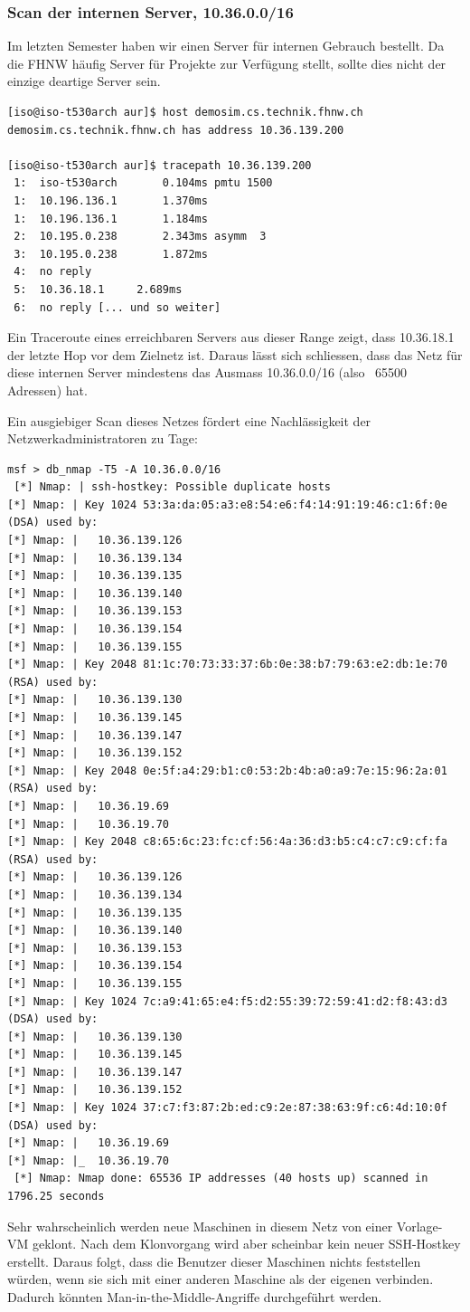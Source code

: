 \documentclass[11pt,a4paper]{scrartcl}
\begin{document}
\subsubsection{Scan der internen Server, 10.36.0.0/16}
Im letzten Semester haben wir einen Server für internen Gebrauch bestellt. Da die FHNW häufig Server für Projekte zur Verfügung stellt, sollte dies nicht der einzige deartige Server sein.
\begin{lstlisting}
[iso@iso-t530arch aur]$ host demosim.cs.technik.fhnw.ch
demosim.cs.technik.fhnw.ch has address 10.36.139.200

[iso@iso-t530arch aur]$ tracepath 10.36.139.200
 1:  iso-t530arch		0.104ms pmtu 1500
 1:  10.196.136.1		1.370ms 
 1:  10.196.136.1		1.184ms 
 2:  10.195.0.238		2.343ms asymm  3 
 3:  10.195.0.238		1.872ms 
 4:  no reply
 5:  10.36.18.1		2.689ms 
 6:  no reply [... und so weiter]
\end{lstlisting}
Ein Traceroute eines erreichbaren Servers aus dieser Range zeigt, dass 10.36.18.1 der letzte Hop vor dem Zielnetz ist. Daraus lässt sich schliessen, dass das Netz für diese internen Server mindestens das Ausmass 10.36.0.0/16 (also ~65500 Adressen) hat.

Ein ausgiebiger Scan dieses Netzes fördert eine Nachlässigkeit der Netzwerkadministratoren zu Tage:
\begin{lstlisting}
msf > db_nmap -T5 -A 10.36.0.0/16
 [*] Nmap: | ssh-hostkey: Possible duplicate hosts
[*] Nmap: | Key 1024 53:3a:da:05:a3:e8:54:e6:f4:14:91:19:46:c1:6f:0e (DSA) used by:
[*] Nmap: |   10.36.139.126
[*] Nmap: |   10.36.139.134
[*] Nmap: |   10.36.139.135
[*] Nmap: |   10.36.139.140
[*] Nmap: |   10.36.139.153
[*] Nmap: |   10.36.139.154
[*] Nmap: |   10.36.139.155
[*] Nmap: | Key 2048 81:1c:70:73:33:37:6b:0e:38:b7:79:63:e2:db:1e:70 (RSA) used by:
[*] Nmap: |   10.36.139.130
[*] Nmap: |   10.36.139.145
[*] Nmap: |   10.36.139.147
[*] Nmap: |   10.36.139.152
[*] Nmap: | Key 2048 0e:5f:a4:29:b1:c0:53:2b:4b:a0:a9:7e:15:96:2a:01 (RSA) used by:
[*] Nmap: |   10.36.19.69
[*] Nmap: |   10.36.19.70
[*] Nmap: | Key 2048 c8:65:6c:23:fc:cf:56:4a:36:d3:b5:c4:c7:c9:cf:fa (RSA) used by:
[*] Nmap: |   10.36.139.126
[*] Nmap: |   10.36.139.134
[*] Nmap: |   10.36.139.135
[*] Nmap: |   10.36.139.140
[*] Nmap: |   10.36.139.153
[*] Nmap: |   10.36.139.154
[*] Nmap: |   10.36.139.155
[*] Nmap: | Key 1024 7c:a9:41:65:e4:f5:d2:55:39:72:59:41:d2:f8:43:d3 (DSA) used by:
[*] Nmap: |   10.36.139.130
[*] Nmap: |   10.36.139.145
[*] Nmap: |   10.36.139.147
[*] Nmap: |   10.36.139.152
[*] Nmap: | Key 1024 37:c7:f3:87:2b:ed:c9:2e:87:38:63:9f:c6:4d:10:0f (DSA) used by:
[*] Nmap: |   10.36.19.69
[*] Nmap: |_  10.36.19.70
 [*] Nmap: Nmap done: 65536 IP addresses (40 hosts up) scanned in 1796.25 seconds
\end{lstlisting}
Sehr wahrscheinlich werden neue Maschinen in diesem Netz von einer Vorlage-VM geklont. Nach dem Klonvorgang wird aber scheinbar kein neuer SSH-Hostkey erstellt. Daraus folgt, dass die Benutzer dieser Maschinen nichts feststellen würden, wenn sie sich mit einer anderen Maschine als der eigenen verbinden. Dadurch könnten Man-in-the-Middle-Angriffe durchgeführt werden.
\end{document}
